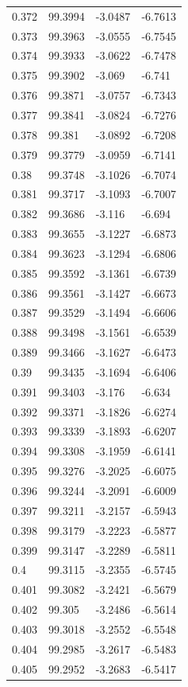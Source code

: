 \begin{tabular}{llll}
0.372 & 99.3994 & -3.0487 & -6.7613 \\
0.373 & 99.3963 & -3.0555 & -6.7545 \\
0.374 & 99.3933 & -3.0622 & -6.7478 \\
0.375 & 99.3902 & -3.069 & -6.741 \\
0.376 & 99.3871 & -3.0757 & -6.7343 \\
0.377 & 99.3841 & -3.0824 & -6.7276 \\
0.378 & 99.381 & -3.0892 & -6.7208 \\
0.379 & 99.3779 & -3.0959 & -6.7141 \\
0.38 & 99.3748 & -3.1026 & -6.7074 \\
0.381 & 99.3717 & -3.1093 & -6.7007 \\
0.382 & 99.3686 & -3.116 & -6.694 \\
0.383 & 99.3655 & -3.1227 & -6.6873 \\
0.384 & 99.3623 & -3.1294 & -6.6806 \\
0.385 & 99.3592 & -3.1361 & -6.6739 \\
0.386 & 99.3561 & -3.1427 & -6.6673 \\
0.387 & 99.3529 & -3.1494 & -6.6606 \\
0.388 & 99.3498 & -3.1561 & -6.6539 \\
0.389 & 99.3466 & -3.1627 & -6.6473 \\
0.39 & 99.3435 & -3.1694 & -6.6406 \\
0.391 & 99.3403 & -3.176 & -6.634 \\
0.392 & 99.3371 & -3.1826 & -6.6274 \\
0.393 & 99.3339 & -3.1893 & -6.6207 \\
0.394 & 99.3308 & -3.1959 & -6.6141 \\
0.395 & 99.3276 & -3.2025 & -6.6075 \\
0.396 & 99.3244 & -3.2091 & -6.6009 \\
0.397 & 99.3211 & -3.2157 & -6.5943 \\
0.398 & 99.3179 & -3.2223 & -6.5877 \\
0.399 & 99.3147 & -3.2289 & -6.5811 \\
0.4 & 99.3115 & -3.2355 & -6.5745 \\
0.401 & 99.3082 & -3.2421 & -6.5679 \\
0.402 & 99.305 & -3.2486 & -6.5614 \\
0.403 & 99.3018 & -3.2552 & -6.5548 \\
0.404 & 99.2985 & -3.2617 & -6.5483 \\
0.405 & 99.2952 & -3.2683 & -6.5417 \\

\end{tabular}
